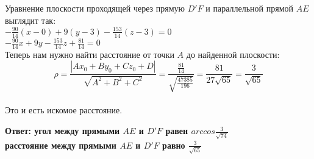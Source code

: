 \documentclass[12pt,a4paper]{scrartcl}
\begin{document}
	Уравнение плоскости проходящей через прямую $D'F$ и параллельной прямой $AE$ выглядит так:\\
	$-\frac{90}{14}(x - 0) + 9(y - 3) -\frac{153}{14}(z - 3) = 0$\\
	$-\frac{90}{14}x + 9y -\frac{153}{14}z + \frac{81}{14}= 0$\\
	Теперь нам нужно найти расстояние от точки $A$ до найденной плоскости:\\
	$$\rho = \frac{|Ax_0 + By_0 + Cz_0 + D|}{\sqrt{A^2 + B^2 + C^2}} = \frac{\frac{81}{14}}{\sqrt{\frac{47385}{196}}} = \frac{81}{27\sqrt{65}} = \frac{3}{\sqrt{65}}$$\\
	Это и есть искомое расстояние.\\
	\begin{flushright}	
		\textbf{Ответ: угол между прямыми $AE$ и $D'F$ равен $arccos\frac{3}{\sqrt{74}}$ \\
		расстояние между прямыми $AE$ и $D'F$ равно $\frac{3}{\sqrt{65}}$ 
	} 
	\end{flushright}
	
\end{document}
